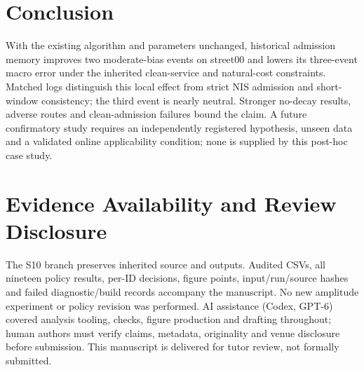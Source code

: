 \documentclass[conference]{IEEEtran}
\begin{document}
\section{Conclusion}
With the existing algorithm and parameters unchanged, historical admission memory improves two moderate-bias events on street00 and lowers its three-event macro error under the inherited clean-service and natural-cost constraints. Matched logs distinguish this local effect from strict NIS admission and short-window consistency; the third event is nearly neutral. Stronger no-decay results, adverse routes and clean-admission failures bound the claim. A future confirmatory study requires an independently registered hypothesis, unseen data and a validated online applicability condition; none is supplied by this post-hoc case study.

\section*{Evidence Availability and Review Disclosure}
The S10 branch preserves inherited source and outputs. Audited CSVs, all nineteen policy results, per-ID decisions, figure points, input/run/source hashes and failed diagnostic/build records accompany the manuscript. No new amplitude experiment or policy revision was performed. AI assistance (Codex, GPT-6) covered analysis tooling, checks, figure production and drafting throughout; human authors must verify claims, metadata, originality and venue disclosure before submission. This manuscript is delivered for tutor review, not formally submitted.


\end{document}
